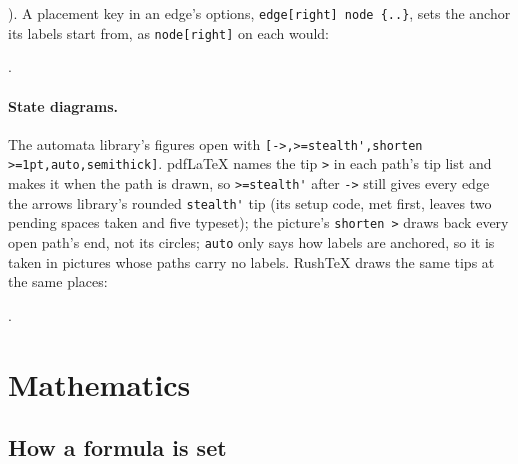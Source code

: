 \documentclass{article}
\numberwithin{equation}{section}
\theoremstyle{definition}
\theoremstyle{remark}
\begin{document}
). A
placement key in an edge's options, \verb|edge[right] node {..}|, sets the anchor its labels
start from, as \verb|node[right]| on each would:
.

\paragraph{State diagrams.} The automata library's figures open with
\verb|[->,>=stealth',shorten >=1pt,auto,semithick]|. pdf\LaTeX{} names the tip \verb|>| in
each path's tip list and makes it when the path is drawn, so \verb|>=stealth'| after
\verb|->| still gives every edge the arrows library's rounded \verb|stealth'| tip (its
setup code, met first, leaves two pending spaces taken and five typeset); the picture's
\verb|shorten >| draws back every open path's end, not its circles; \verb|auto| only says
how labels are anchored, so it is taken in pictures whose paths carry no labels.
RushTeX draws the same tips at the same places:
.


\section{Mathematics}\label{sec:math}

\subsection{How a formula is set}
\end{document}
